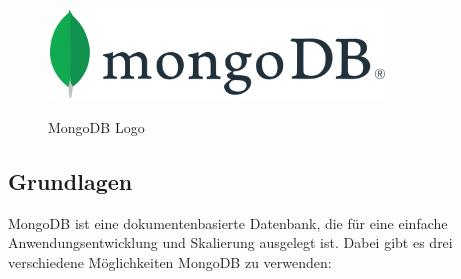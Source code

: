 \begin{figure}[h!]
    \centering
    \includegraphics[width=0.8\textwidth]{pics/mongodb.png}
    \caption{MongoDB Logo}
    \cite{database_mongodb_logo}
    \label{fig:enter-label}
\end{figure}

\subsection{Grundlagen}
MongoDB ist eine dokumentenbasierte Datenbank, die für eine einfache Anwendungsentwicklung und Skalierung ausgelegt ist. Dabei gibt es drei verschiedene Möglichkeiten MongoDB zu verwenden: 
